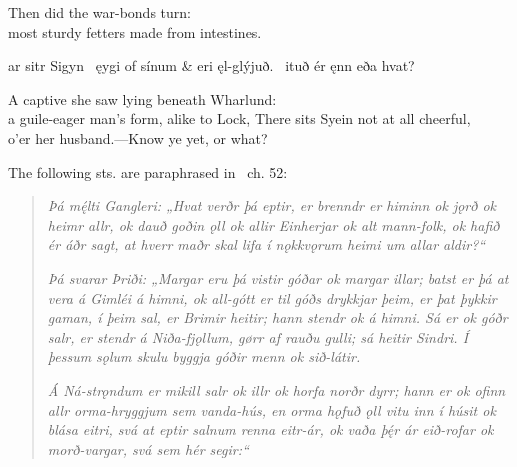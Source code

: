 \bvb Then did  the war-bonds turn: \\
most sturdy fetters made from intestines.\evb\evg


\bvg\bva{}%
ar sitr Sigyn \hld\ ęygi of sínum &
eri ęl-glýjuð. \hld\ ituð ér ęnn eða hvat?\eva

\bvb A captive  she saw lying beneath Wharlund: \\
a guile-eager man’s form, alike to Lock,
There sits Syein not at all cheerful, \\
o’er her husband.—Know ye yet, or what?\evb\evg

\sectionline

The following sts. are paraphrased in \Gylfaginning\ ch. 52:

\begin{quote}
	\emph{Þá mę́lti Gangleri: „Hvat verðr þá eptir, er brenndr er himinn ok jǫrð ok heimr allr, ok dauð goðin ǫll ok allir Einherjar ok alt mann-folk, ok hafið ér áðr sagt, at hverr maðr skal lifa í nǫkkvǫrum heimi um allar aldir?“}

	\emph{Þá svarar Þriði: „Margar eru þá vistir góðar ok margar illar; batst er þá at vera á Gimléi á himni, ok all-gótt er til góðs drykkjar þeim, er þat þykkir gaman, í þeim sal, er Brimir heitir; hann stendr ok á himni. Sá er ok góðr salr, er stendr á Niða-fjǫllum, gørr af rauðu gulli; sá heitir Sindri. Í þessum sǫlum skulu byggja góðir menn ok sið-látir.}

	\emph{Á Ná-strǫndum er mikill salr ok illr ok horfa norðr dyrr; hann er ok ofinn allr orma-hryggjum sem vanda-hús, en orma hǫfuð ǫll vitu inn í húsit ok blása eitri, svá at eptir salnum renna eitr-ár, ok vaða þę́r ár eið-rofar ok morð-vargar, svá sem hér segir:“}
\end{quote}

